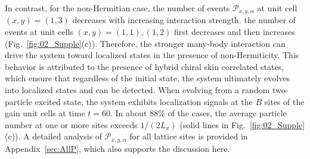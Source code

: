 \documentclass[longbibliography, aps, prx, amsmath, amssymb, amsfonts, twocolumn,superscriptaddress, footinbib]{revtex4-1}
\begin{document}
	In contrast, for the non-Hermitian case, the number of events $\mathcal{P}_{x,y,\alpha}$ at unit cell $(x,y)=(1,3)$ decreases with increasing interaction strength. the number of events at unit cells $(x,y)=(1,1),(1,2)$ first decreases and then increases (Fig.~\ref{fig:02_Supple}(c)). 
	Therefore, the stronger many-body interaction can drive the system toward localized states in the presence of non-Hermiticity.
	This behavior is attributed to the presence of hybrid chiral skin correlated states, which ensure that regardless of the initial state, the system ultimately evolves into localized states and can be detected.
	When evolving from a random two-particle excited state, the system exhibits localization signals at the $B$ sites of the gain unit cells at time $t=60$.
	In about $88\%$ of the cases, the average particle number at one or more sites exceeds $1/(2L_x)$ (solid lines in Fig.~\ref{fig:02_Supple}(c)).
	A detailed analysis of $\mathcal{P}_{x,y,\alpha}$ for all lattice sites is provided in Appendix~\ref{sec:AllP}, which also supports the discussion here. 
\end{document}
